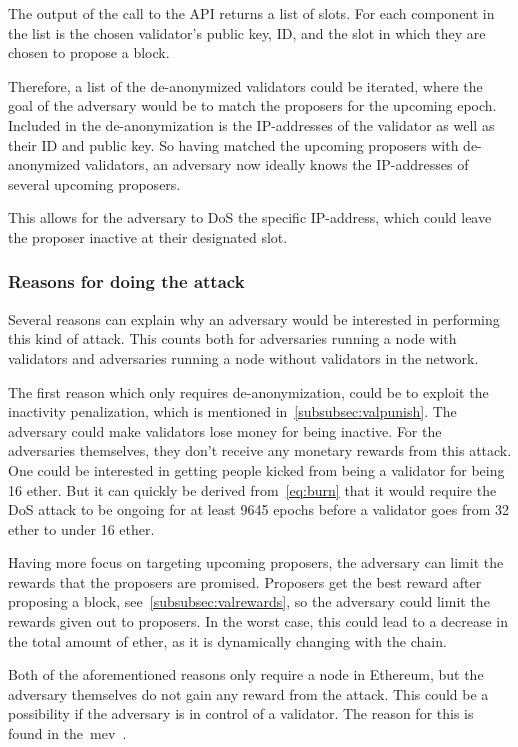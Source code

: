 The output of the call to the API returns a list of slots.
For each component in the list is the chosen validator's public key,
ID, and the slot in which they are chosen to propose a block.

Therefore, a list of the de-anonymized validators could be iterated,
where the goal of the adversary would be to match the proposers for the upcoming epoch.
Included in the de-anonymization is the IP-addresses of the validator as well as their ID and public key.
So having matched the upcoming proposers with de-anonymized validators,
an adversary now ideally knows the IP-addresses of several upcoming proposers.

This allows for the adversary to DoS the specific IP-address,
which could leave the proposer inactive at their designated slot.

\subsubsection{Reasons for doing the attack}

Several reasons can explain why an adversary would be interested in performing this kind of attack.
This counts both for adversaries running a node with validators and adversaries running a node without validators in the network.


The first reason which only requires de-anonymization, could be to exploit the inactivity penalization,
which is mentioned in~\autoref{subsubsec:valpunish}.
The adversary could make validators lose money for being inactive.
For the adversaries themselves, they don't receive any monetary rewards from this attack. 
One could be interested in getting people kicked from being a validator for being 16 ether.
But it can quickly be derived from~\autoref{eq:burn} that it would require the DoS attack
to be ongoing for at least 9645 epochs before a validator goes from 32 ether to under 16 ether.


Having more focus on targeting upcoming proposers, the adversary can limit the rewards that the proposers are promised.
Proposers get the best reward after proposing a block, see~\autoref{subsubsec:valrewards},
so the adversary could limit the rewards given out to proposers.
In the worst case, this could lead to a decrease in the total amount of ether,
as it is dynamically changing with the chain.


Both of the aforementioned reasons only require a node in Ethereum,
but the adversary themselves do not gain any reward from the attack.
This could be a possibility if the adversary is in control of a validator.
The reason for this is found in the~\gls{mev}~\cite{mev}.

